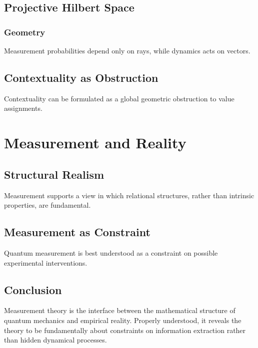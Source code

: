 \documentclass[12pt]{book}
\theoremstyle{plain}
\theoremstyle{definition}
\theoremstyle{remark}
\begin{document}
\chapter{Projective Hilbert Space}

\section{Geometry}
Measurement probabilities depend only on rays, while dynamics acts on vectors.

\chapter{Contextuality as Obstruction}
Contextuality can be formulated as a global geometric obstruction to value assignments.

\part{Measurement and Reality}

\chapter{Structural Realism}
Measurement supports a view in which relational structures, rather than intrinsic properties, are fundamental.

\chapter{Measurement as Constraint}
Quantum measurement is best understood as a constraint on possible experimental interventions.

\backmatter

\chapter*{Conclusion}
Measurement theory is the interface between the mathematical structure of quantum mechanics and empirical reality. Properly understood, it reveals the theory to be fundamentally about constraints on information extraction rather than hidden dynamical processes.
\end{document}
